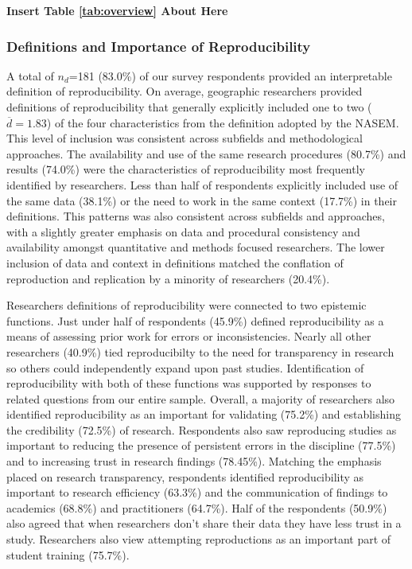 \documentclass[]{interact}
\theoremstyle{plain}%
\theoremstyle{definition}
\theoremstyle{remark}
\begin{document}
\begin{center}
\textbf{Insert Table \ref{tab:overview} About Here}
\end{center}


\subsubsection*{Definitions and Importance of Reproducibility}
A total of \textit{$n_{d}$}=181 (83.0\%) of our survey respondents provided an interpretable definition of reproducibility.  
On average, geographic researchers provided definitions of reproducibility that generally explicitly included one to two ($\overline{d}=1.83$) of the four characteristics from the definition adopted by the NASEM.
This level of inclusion was consistent across subfields and methodological approaches.
The availability and use of the same research procedures (80.7\%) and results (74.0\%) were the characteristics of reproducibility most frequently identified by researchers. 
Less than half of respondents explicitly included use of the same data (38.1\%) or the need to work in the same context (17.7\%) in their definitions. 
This patterns was also consistent across subfields and approaches, with a slightly greater emphasis on data and procedural consistency and availability amongst quantitative and methods focused researchers.
The lower inclusion of data and context in definitions matched the conflation of reproduction and replication by a minority of researchers (20.4\%). 

Researchers definitions of reproducibility were connected to two epistemic functions.
Just under half of respondents (45.9\%) defined reproducibility as a means of assessing prior work for errors or inconsistencies.
Nearly all other researchers (40.9\%) tied reproducibilty to the need for transparency in research so others could independently expand upon past studies.
Identification of reproducibility with both of these functions was supported by responses to related questions from our entire sample. 
Overall, a majority of researchers also identified reproducibility as an important for validating (75.2\%) and establishing the credibility (72.5\%) of research.  
Respondents also saw reproducing studies as important to reducing the presence of persistent errors in the discipline (77.5\%) and to increasing trust in research findings (78.45\%).
Matching the emphasis placed on research transparency, respondents identified reproducibility as important to research efficiency (63.3\%) and the communication of findings to academics (68.8\%) and practitioners (64.7\%). 
Half of the respondents (50.9\%) also agreed that when researchers don't share their data they have less trust in a study.
Researchers also view attempting reproductions as an important part of student training (75.7\%). 
\end{document}
